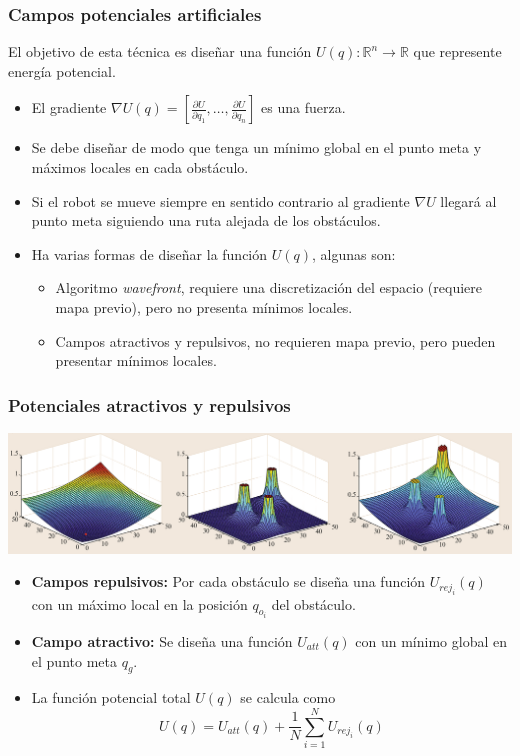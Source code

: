 \begin{frame}\frametitle{Campos potenciales artificiales}
  El objetivo de esta técnica es diseñar una función $U(q):\mathbb{R}^n\rightarrow \mathbb{R}$ que represente energía potencial.
  \begin{itemize}
  \item El gradiente $\nabla U(q) = \left[\frac{\partial U}{\partial q_1},\dots,\frac{\partial U}{\partial q_n}\right]$ es una fuerza.
  \item Se debe diseñar de modo que tenga un mínimo global en el punto meta y máximos locales en cada obstáculo.
  \item Si el robot se mueve siempre en sentido contrario al gradiente $\nabla U$ llegará al punto meta siguiendo una ruta alejada de los obstáculos.
  \item Ha varias formas de diseñar la función $U(q)$, algunas son:
    \begin{itemize}
    \item Algoritmo \textit{wavefront}, requiere una discretización del espacio (requiere mapa previo), pero no presenta mínimos locales.
    \item Campos atractivos y repulsivos, no requieren mapa previo, pero pueden presentar mínimos locales. 
    \end{itemize}
  \end{itemize}
\end{frame}

\begin{frame}\frametitle{Potenciales atractivos y repulsivos}
  \includegraphics[width=\textwidth]{Figures/MotionPlanning/PotFieldsExample.png}
  \begin{itemize}
  \item \textbf{Campos repulsivos:} Por cada obstáculo se diseña una función $U_{rej_i}(q)$ con un máximo local en la posición $q_{o_i}$ del obstáculo.
  \item \textbf{Campo atractivo:} Se diseña una función $U_{att}(q)$ con un mínimo global en el punto meta $q_g$.
  \item La función potencial total $U(q)$ se calcula como
    \[ U(q) = U_{att}(q) + \frac{1}{N}\sum_{i=1}^N U_{rej_i}(q)\]
  \end{itemize}
\end{frame}

